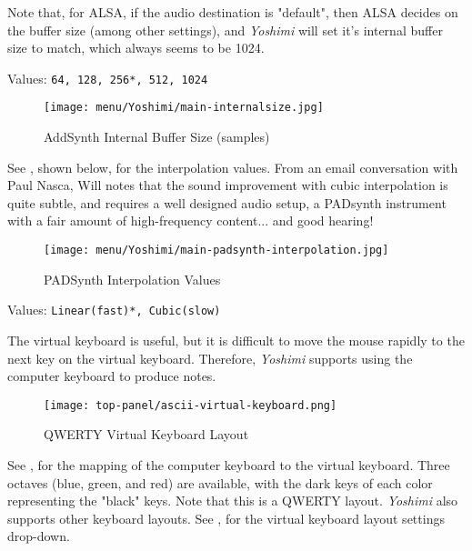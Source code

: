    Note that, for ALSA, if the audio destination is "default",
   then ALSA decides on the buffer size (among other settings), and
   \textsl{Yoshimi} will set it's internal buffer size to match,
   which always seems to be 1024.

   Values: \texttt{64, 128, 256*, 512, 1024}

\begin{figure}[H]
   \centering 
   \texttt{[image: menu/Yoshimi/main-internalsize.jpg]}
   \caption[Internal Size Values]{AddSynth Internal Buffer Size (samples)}
   \label{fig:yoshimi_internalsize_values}
\end{figure}

   See , shown below,
   for the interpolation values.
   From an email conversation with Paul Nasca, Will notes that
   the sound improvement with cubic interpolation is quite subtle, and requires
   a well designed audio setup, a PADsynth instrument with a fair amount of
   high-frequency content... and good hearing!

\begin{figure}[H]
   \centering 
   \texttt{[image: menu/Yoshimi/main-padsynth-interpolation.jpg]}
   \caption[PADSynth Interpolation]{PADSynth Interpolation Values}
   \label{fig:padsynth_interpolation}
\end{figure}

   Values: \texttt{Linear(fast)*, Cubic(slow)}

   The virtual keyboard is useful, but it is difficult to move the mouse
   rapidly to the next key on the virtual keyboard.
   Therefore, \textsl{Yoshimi} supports using the computer keyboard
   to produce notes.

\begin{figure}[H]
   \centering 
   \texttt{[image: top-panel/ascii-virtual-keyboard.png]}
   \caption{QWERTY Virtual Keyboard Layout}
   \label{fig:qwerty_virtual_keyboard}
\end{figure}

   See ,
   for the mapping of the computer keyboard to the
   virtual keyboard.
   Three octaves (blue, green, and red) are available, with the dark keys of
   each color representing the "black" keys.
   Note that this is a QWERTY layout.  
   \textsl{Yoshimi} also supports other keyboard layouts.
   See ,
   for the virtual keyboard layout settings drop-down.

